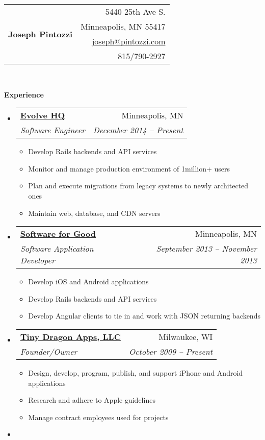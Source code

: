 \documentclass[letterpaper,12pt]{article}
\makeatletter
\newcommand{\resitem}[1]{\item #1 \vspace{-2pt}}
\newcommand{\resheading}[1]{{\large \colorbox{mygrey}{\begin{minipage}{\textwidth}{\textbf{#1 \vphantom{p\^{E}}}}\end{minipage}}}}
\newcommand{\ressubheading}[4]{
\begin{tabular*}{6.5in}{l@{\extracolsep{\fill}}r}
		\textbf{#1} & #2 \\
		\textit{#3} & \textit{#4} \\
\end{tabular*}\vspace{-6pt}}
\makeatother
\begin{document}
\newcommand{\mywebheader}{
\begin{tabular*}{7in}{l@{\extracolsep{\fill}}r}
	\multirow{4}{*}{\huge \bf Joseph Pintozzi} & {5440 25th Ave S.}\\
														& {Minneapolis, MN 55417}\\
														& \href{mailto:joseph@pintozzi.com}{joseph@pintozzi.com}\\
														& {815/790-2927}
	\end{tabular*}
\\
\vspace{0.1in}
}

\mywebheader

\resheading{Experience}
	\begin{itemize}
     \item
			\ressubheading{\href{http://evolvehq.com/}{Evolve HQ}}{Minneapolis, MN}{Software Engineer}{December 2014 -- Present}
				{ \footnotesize
				\begin{itemize}
					\resitem{Develop Rails backends and API services}
					\resitem{Monitor and manage production environment of 1million+ users}
					\resitem{Plan and execute migrations from legacy systems to newly architected ones}
					\resitem{Maintain web, database, and CDN servers}
				\end{itemize}
         }
     \item
			\ressubheading{\href{http://softwareforgood.com/}{Software for Good}}{Minneapolis, MN}{Software Application Developer}{September 2013 -- November 2013}
				{ \footnotesize
				\begin{itemize}
					\resitem{Develop iOS and Android applications}
					\resitem{Develop Rails backends and API services}
					\resitem{Develop Angular clients to tie in and work with JSON returning backends}
				\end{itemize}
         }
     \item
			\ressubheading{\href{http://itunes.apple.com/WebObjects/MZStore.woa/wa/viewArtist?id=337595590}{Tiny Dragon Apps, LLC}}{Milwaukee, WI}{Founder/Owner}{October 2009 -- Present}
				{ \footnotesize
				\begin{itemize}
					\resitem{Design, develop, program, publish, and support iPhone and Android applications}
					\resitem{Research and adhere to Apple guidelines}
					\resitem{Manage contract employees used for projects}
				\end{itemize}
         }
     \item

\end{itemize}
\end{document}
